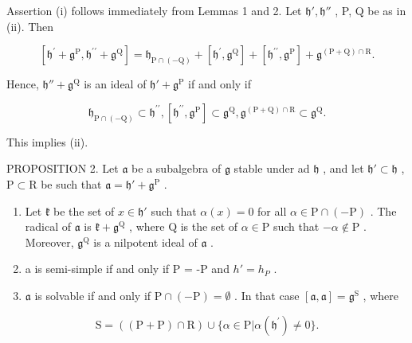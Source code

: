 Assertion (i) follows immediately from Lemmas 1 and 2. Let \(\mathfrak{h}',\mathfrak{h}''\) , P, Q be as in (ii). Then

\[
[ \mathfrak {h} ^ {\prime} + \mathfrak {g} ^ {\mathrm{P}}, \mathfrak {h} ^ {\prime \prime} + \mathfrak {g} ^ {\mathrm{Q}} ] = \mathfrak {h} _ {\mathrm{P} \cap (- \mathrm{Q})} + [ \mathfrak {h} ^ {\prime}, \mathfrak {g} ^ {\mathrm{Q}} ] + [ \mathfrak {h} ^ {\prime \prime}, \mathfrak {g} ^ {\mathrm{P}} ] + \mathfrak {g} ^ {(\mathrm{P} + \mathrm{Q}) \cap \mathrm{R}}.
\]

Hence, \(\mathfrak{h}'' + \mathfrak{g}^{\mathrm{Q}}\) is an ideal of \(\mathfrak{h}' + \mathfrak{g}^{\mathrm{P}}\) if and only if

\[
\mathfrak {h} _ {\mathrm{P} \cap (- \mathrm{Q})} \subset \mathfrak {h} ^ {\prime \prime}, [ \mathfrak {h} ^ {\prime \prime}, \mathfrak {g} ^ {\mathrm{P}} ] \subset \mathfrak {g} ^ {\mathrm{Q}}, \mathfrak {g} ^ {(\mathrm{P} + \mathrm{Q}) \cap \mathrm{R}} \subset \mathfrak {g} ^ {\mathrm{Q}}.
\]

This implies (ii).

PROPOSITION 2. Let \(\mathfrak{a}\) be a subalgebra of \(\mathfrak{g}\) stable under ad \(\mathfrak{h}\) , and let \(\mathfrak{h}' \subset \mathfrak{h}\) , \(\mathrm{P} \subset \mathrm{R}\) be such that \(\mathfrak{a} = \mathfrak{h}' + \mathfrak{g}^{\mathrm{P}}\) .

\begin{enumerate}
\def\labelenumi{(\roman{enumi})}
\item
  Let \(\mathfrak{k}\) be the set of \(x\in \mathfrak{h}'\) such that \(\alpha (x) = 0\) for all \(\alpha \in \mathrm{P}\cap (-\mathrm{P})\) . The radical of \(\mathfrak{a}\) is \(\mathfrak{k} + \mathfrak{g}^{\mathrm{Q}}\) , where \(\mathrm{Q}\) is the set of \(\alpha \in \mathrm{P}\) such that \(-\alpha \notin \mathrm{P}\) . Moreover, \(\mathfrak{g}^{\mathrm{Q}}\) is a nilpotent ideal of \(\mathfrak{a}\) .
\item
  a is semi-simple if and only if P = -P and \(h' = h_{P}\) .
\item
  \(\mathfrak{a}\) is solvable if and only if \(\mathrm{P} \cap (-\mathrm{P}) = \emptyset\) . In that case \([\mathfrak{a}, \mathfrak{a}] = \mathfrak{g}^{\mathrm{S}}\) , where
\end{enumerate}

\[
\mathrm{S} = ((\mathrm{P} + \mathrm{P}) \cap \mathrm{R}) \cup \{\alpha \in \mathrm{P} | \alpha (\mathfrak {h} ^ {\prime}) \neq 0 \}.
\]

